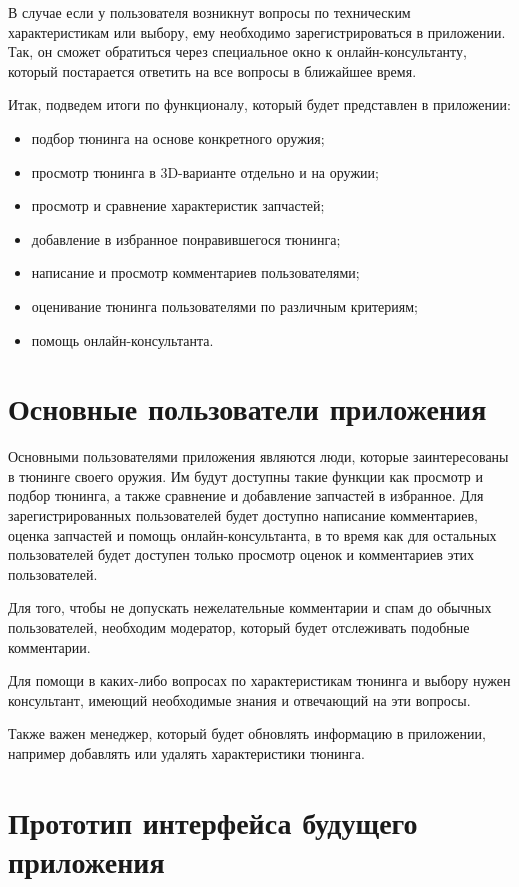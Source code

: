 \documentclass[14pt]{extreport}
\begin{document}
В случае если у пользователя возникнут вопросы по техническим характеристикам или выбору, ему необходимо зарегистрироваться в приложении. Так, он сможет обратиться через специальное окно к онлайн-консультанту, который постарается ответить на все вопросы в ближайшее время.

Итак, подведем итоги по функционалу, который будет представлен в приложении:
\begin{itemize}
\item подбор тюнинга на основе конкретного оружия;
\item просмотр тюнинга в 3D-варианте отдельно и на оружии;
\item просмотр и сравнение характеристик запчастей;
\item добавление в избранное понравившегося тюнинга;
\item написание и просмотр комментариев пользователями;
\item оценивание тюнинга пользователями по различным критериям;
\item помощь онлайн-консультанта.
\end{itemize}

\newpage
\section{Основные пользователи приложения}

Основными пользователями приложения являются люди, которые заинтересованы в тюнинге своего оружия. Им будут доступны такие функции как просмотр и подбор тюнинга, а также сравнение и добавление запчастей в избранное. Для зарегистрированных пользователей будет доступно написание комментариев, оценка запчастей и помощь онлайн-консультанта, в то время как для остальных пользователей будет доступен только просмотр оценок и комментариев этих пользователей.

Для того, чтобы не допускать нежелательные комментарии и спам до обычных пользователей, необходим модератор, который будет отслеживать подобные комментарии.

Для помощи в каких-либо вопросах по характеристикам тюнинга и выбору нужен консультант, имеющий необходимые знания и отвечающий на эти вопросы.

Также важен менеджер, который будет обновлять информацию в приложении, например добавлять или удалять характеристики тюнинга.

\newpage
\section{Прототип интерфейса будущего приложения}
\end{document}
